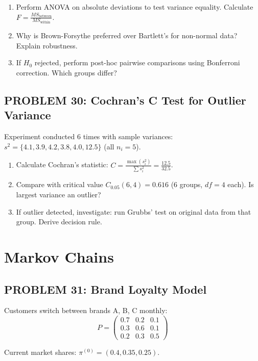 \documentclass[12pt]{article}
\begin{document}
\begin{enumerate}
\item[(a)] Perform ANOVA on absolute deviations to test variance equality. Calculate \(F = \frac{MS_{\text{between}}}{MS_{\text{within}}}\).
\item[(b)] Why is Brown-Forsythe preferred over Bartlett's for non-normal data? Explain robustness.
\item[(c)] If \(H_0\) rejected, perform post-hoc pairwise comparisons using Bonferroni correction. Which groups differ?
\end{enumerate}

\subsection*{PROBLEM 30: Cochran's C Test for Outlier Variance}

Experiment conducted 6 times with sample variances: \(s^2 = \{4.1, 3.9, 4.2, 3.8, 4.0, 12.5\}\) (all \(n_i=5\)).

\begin{enumerate}
\item[(a)] Calculate Cochran's statistic: \(C = \frac{\max(s_i^2)}{\sum s_i^2} = \frac{12.5}{32.5}\).
\item[(b)] Compare with critical value \(C_{0.05}(6, 4) = 0.616\) (6 groups, \(df=4\) each). Is largest variance an outlier?
\item[(c)] If outlier detected, investigate: run Grubbs' test on original data from that group. Derive decision rule.
\end{enumerate}

\newpage
\section*{Markov Chains}

\subsection*{PROBLEM 31: Brand Loyalty Model}

Customers switch between brands A, B, C monthly:
\[
P = \begin{pmatrix}
0.7 & 0.2 & 0.1 \\
0.3 & 0.6 & 0.1 \\
0.2 & 0.3 & 0.5
\end{pmatrix}
\]

Current market shares: \(\pi^{(0)} = (0.4, 0.35, 0.25)\).
\end{document}
